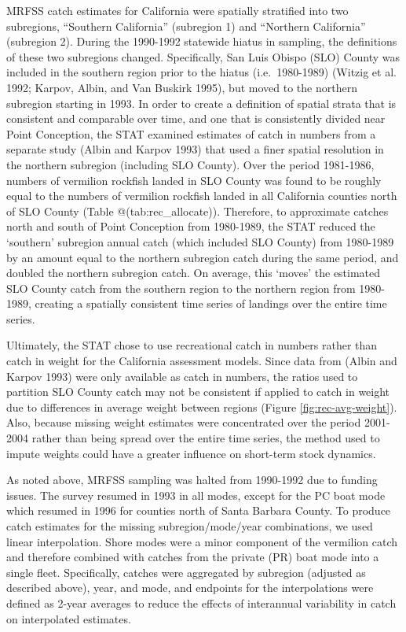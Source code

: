 \documentclass[
  english,
  a4paper,
]{article}
\begin{document}
MRFSS catch estimates for California were spatially stratified into two subregions,
``Southern California'' (subregion 1) and ``Northern California'' (subregion 2).
During the 1990-1992 statewide hiatus in sampling, the definitions of these two
subregions changed. Specifically, San Luis Obispo (SLO) County was included in
the southern region prior to the hiatus (i.e.~1980-1989) (Witzig et al. 1992; Karpov, Albin, and Van Buskirk 1995),
but moved to the northern subregion starting in 1993. In order to create a
definition of spatial strata that is consistent and comparable over time, and
one that is consistently divided near Point Conception, the STAT examined
estimates of catch in numbers from a separate study (Albin and Karpov 1993) that used a finer spatial
resolution in the northern subregion (including SLO County). Over the period
1981-1986, numbers of vermilion rockfish landed in SLO County was found to
be roughly equal to the numbers of vermilion rockfish landed in all California
counties north of SLO County (Table @(tab:rec\_allocate)). Therefore, to approximate catches north
and south of Point Conception from 1980-1989, the STAT reduced the `southern'
subregion annual catch (which included SLO County) from 1980-1989 by an amount
equal to the northern subregion catch during the same period, and doubled the
northern subregion catch. On average, this `moves' the estimated SLO County
catch from the southern region to the northern region from 1980-1989, creating
a spatially consistent time series of landings over the entire time series.

Ultimately, the STAT chose to use recreational catch in numbers rather than catch in weight for the California assessment models. Since data from (Albin and Karpov 1993) were only available as catch in numbers, the ratios used to partition SLO County catch may not be consistent if applied to catch in weight due to differences in average weight between regions (Figure \ref{fig:rec-avg-weight}). Also, because missing weight estimates were concentrated over the period 2001-2004 rather than being spread over the entire time series, the method used to impute weights could have a greater influence on short-term stock dynamics.

As noted above, MRFSS sampling was halted from 1990-1992 due to funding issues.
The survey resumed in 1993 in all modes, except for the PC boat
mode which resumed in 1996 for counties north of Santa Barbara County. To
produce catch estimates for the missing subregion/mode/year combinations, we
used linear interpolation. Shore modes were a minor component of the vermilion
catch and therefore combined with catches from the private (PR) boat mode into
a single fleet. Specifically, catches were aggregated by subregion (adjusted as
described above), year, and mode, and endpoints for the interpolations were
defined as 2-year averages to reduce the effects of interannual variability
in catch on interpolated estimates.
\end{document}
